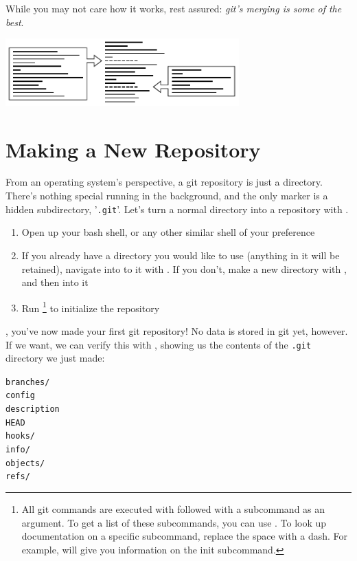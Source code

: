 \documentclass[11pt,letterpaper,twoside]{report}
\begin{document}
While you may not care how it works, rest assured: \emph{git's merging is some
of the best}.

\vspace{\fill}
\begin{flushright}
\includegraphics[width=9cm]{resources/patches_abstract.pdf}
\end{flushright}
\vspace*{\fill}

\chapter{Making a New Repository}

From an operating system's perspective, a git repository is just a directory.
There's nothing special running in the background, and the only marker is a
hidden subdirectory, '\texttt{.git}'. Let's turn a normal directory into a
repository with .

\begin{enumerate}
\item Open up your bash shell, or any other similar shell of your preference
\item If you already have a directory you would like to use (anything in it will
    be retained), navigate into to it with . If you don't, make a new
    directory with , and then  into it
\item Run \footnote{All git commands are executed with
     followed with a subcommand as an argument. To get a list of
    these subcommands, you can use . To look up documentation on
    a specific subcommand, replace the space with a dash. For example,
     will give you information on the init subcommand.} to
    initialize the repository
\end{enumerate}

, you've now made your first git repository! No data is
stored in git yet, however. If we want, we can verify this with
, showing us the contents of the \texttt{.git} directory we just
made:

\begin{multicols}{4}
\noindent
\texttt{branches/}\\
\texttt{config}\\
\texttt{description}\\
\texttt{HEAD}\\
\texttt{hooks/}\\
\texttt{info/}\\
\texttt{objects/}\\
\texttt{refs/}
\end{multicols}
\end{document}
